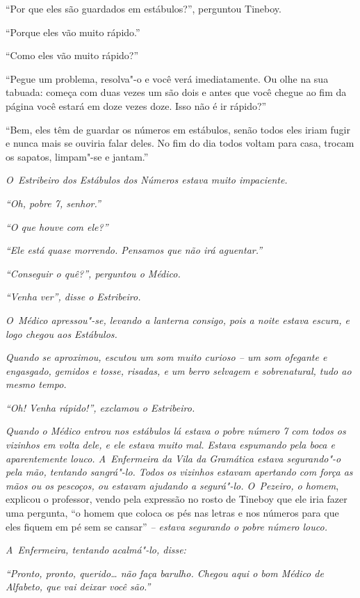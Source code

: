 ``Por que eles são guardados em estábulos?'', perguntou Tineboy.

``Porque eles vão muito rápido.''

``Como eles vão muito rápido?''

``Pegue um problema, resolva"-o e você verá imediatamente. Ou olhe na sua
tabuada: começa com duas vezes um são dois e antes que você chegue ao
fim da página você estará em doze vezes doze. Isso não é ir rápido?''

``Bem, eles têm de guardar os números em estábulos, senão todos eles
iriam fugir e nunca mais se ouviria falar deles. No fim do dia
todos voltam para casa, trocam os sapatos, limpam"-se e jantam.''

\emph{O~Estribeiro dos Estábulos dos Números estava muito impaciente.}

\emph{``Oh, pobre 7, senhor.''}

\emph{``O que houve com ele?''}

\emph{``Ele está quase morrendo. Pensamos que não irá
aguentar.''}

\emph{``Conseguir o quê?'', perguntou o Médico.}

\emph{``Venha ver'', disse o Estribeiro.}

\emph{O~Médico apressou"-se, levando a lanterna consigo, pois a noite
estava escura, e logo chegou aos Estábulos.}

\emph{Quando se aproximou, escutou um som muito curioso -- um som
ofegante e engasgado, gemidos e tosse, risadas, e um berro selvagem e
sobrenatural, tudo ao mesmo tempo.}

\emph{``Oh! Venha rápido!'', exclamou o Estribeiro.}

\emph{Quando o Médico entrou nos estábulos lá estava o pobre número 7
com todos os vizinhos em volta dele, e ele estava muito mal. Estava
espumando pela boca e aparentemente louco. A~Enfermeira da Vila da
Gramática estava segurando"-o pela mão, tentando sangrá"-lo. Todos os
vizinhos estavam apertando com força as mãos ou os pescoços, ou estavam
ajudando a segurá"-lo. O~Pezeiro, o homem}, explicou o professor, vendo
pela expressão no rosto de Tineboy que ele iria fazer uma pergunta, ``o
homem que coloca os pés nas letras e nos números para que eles fiquem em
pé sem se cansar'' \emph{-- estava segurando o pobre número louco.}

\emph{A~Enfermeira, tentando acalmá"-lo, disse:}

\emph{``Pronto, pronto, querido\ldots{} não faça barulho. Chegou aqui o
bom Médico de Alfabeto, que vai deixar você são.''}

